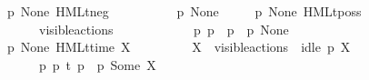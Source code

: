 \begin{isabellebody}
\ \ {\isacharbar}{\kern0pt}\ {\isacartoucheopen}{\isacharparenleft}{\kern0pt}p\ {\isasymTTurnstile}{\isacharquery}{\kern0pt}{\isacharbrackleft}{\kern0pt}None{\isacharbrackright}{\kern0pt}\ {\isacharparenleft}{\kern0pt}HMLt{\isacharunderscore}{\kern0pt}neg\ {\isasymphi}{\isacharparenright}{\kern0pt}{\isacharparenright}{\kern0pt}\ {\isacharequal}{\kern0pt}\ \isanewline
\ \ \ \ \ \ {\isacharparenleft}{\kern0pt}{\isasymnot}\ p\ {\isasymTTurnstile}{\isacharquery}{\kern0pt}{\isacharbrackleft}{\kern0pt}None{\isacharbrackright}{\kern0pt}\ {\isasymphi}{\isacharparenright}{\kern0pt}{\isacartoucheclose}\ \isanewline
\ \ {\isacharbar}{\kern0pt}\ {\isacartoucheopen}{\isacharparenleft}{\kern0pt}p\ {\isasymTTurnstile}{\isacharquery}{\kern0pt}{\isacharbrackleft}{\kern0pt}None{\isacharbrackright}{\kern0pt}\ {\isacharparenleft}{\kern0pt}HMLt{\isacharunderscore}{\kern0pt}poss\ {\isasymalpha}\ {\isasymphi}{\isacharparenright}{\kern0pt}{\isacharparenright}{\kern0pt}\ {\isacharequal}{\kern0pt}\ \isanewline
\ \ \ \ \ \ {\isacharparenleft}{\kern0pt}{\isacharparenleft}{\kern0pt}{\isasymalpha}\ {\isasymin}\ visible{\isacharunderscore}{\kern0pt}actions\ {\isasymunion}\ {\isacharbraceleft}{\kern0pt}{\isasymtau}{\isacharbraceright}{\kern0pt}{\isacharparenright}{\kern0pt}\ {\isasymand}\ \isanewline
\ \ \ \ \ \ \ {\isacharparenleft}{\kern0pt}{\isasymexists}\ p{\isacharprime}{\kern0pt}{\isachardot}{\kern0pt}\ p\ {\isasymlongmapsto}{\isasymalpha}\ p{\isacharprime}{\kern0pt}\ {\isasymand}\ p{\isacharprime}{\kern0pt}\ {\isasymTTurnstile}{\isacharquery}{\kern0pt}{\isacharbrackleft}{\kern0pt}None{\isacharbrackright}{\kern0pt}\ {\isasymphi}{\isacharparenright}{\kern0pt}{\isacharparenright}{\kern0pt}{\isacartoucheclose}\ \isanewline
\ \ {\isacharbar}{\kern0pt}\ {\isacartoucheopen}{\isacharparenleft}{\kern0pt}p\ {\isasymTTurnstile}{\isacharquery}{\kern0pt}{\isacharbrackleft}{\kern0pt}None{\isacharbrackright}{\kern0pt}\ {\isacharparenleft}{\kern0pt}HMLt{\isacharunderscore}{\kern0pt}time\ X\ {\isasymphi}{\isacharparenright}{\kern0pt}{\isacharparenright}{\kern0pt}\ {\isacharequal}{\kern0pt}\ \isanewline
\ \ \ \ \ \ {\isacharparenleft}{\kern0pt}{\isacharparenleft}{\kern0pt}X\ {\isasymsubseteq}\ visible{\isacharunderscore}{\kern0pt}actions{\isacharparenright}{\kern0pt}\ {\isasymand}\ {\isacharparenleft}{\kern0pt}idle\ p\ X{\isacharparenright}{\kern0pt}\ {\isasymand}\ \isanewline
\ \ \ \ \ \ \ {\isacharparenleft}{\kern0pt}{\isasymexists}\ p{\isacharprime}{\kern0pt}{\isachardot}{\kern0pt}\ p\ {\isasymlongmapsto}t\ p{\isacharprime}{\kern0pt}\ {\isasymand}\ p{\isacharprime}{\kern0pt}\ {\isasymTTurnstile}{\isacharquery}{\kern0pt}{\isacharbrackleft}{\kern0pt}Some\ X{\isacharbrackright}{\kern0pt}\ {\isasymphi}{\isacharparenright}{\kern0pt}{\isacharparenright}{\kern0pt}{\isacartoucheclose}\ \isanewline

\end{isabellebody}
